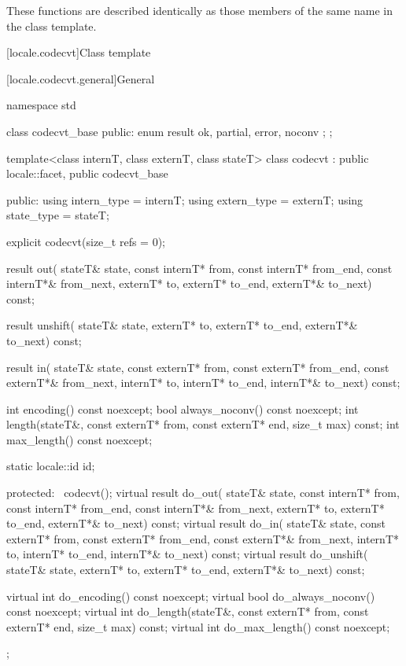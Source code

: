 \pnum
These functions are described identically as those members of the same name
in the  class template.

[locale.codecvt]{Class template }

[locale.codecvt.general]{General}

%
\begin{codeblock}
namespace std {
  class codecvt_base {
  public:
    enum result { ok, partial, error, noconv };
  };

  template<class internT, class externT, class stateT>
    class codecvt : public locale::facet, public codecvt_base {
    public:
      using intern_type = internT;
      using extern_type = externT;
      using state_type  = stateT;

      explicit codecvt(size_t refs = 0);

      result out(
        stateT& state,
        const internT* from, const internT* from_end, const internT*& from_next,
              externT*   to,       externT*   to_end,       externT*&   to_next) const;

      result unshift(
        stateT& state,
              externT*    to,      externT*   to_end,       externT*&   to_next) const;

      result in(
        stateT& state,
        const externT* from, const externT* from_end, const externT*& from_next,
              internT*   to,       internT*   to_end,       internT*&   to_next) const;

      int encoding() const noexcept;
      bool always_noconv() const noexcept;
      int length(stateT&, const externT* from, const externT* end, size_t max) const;
      int max_length() const noexcept;

      static locale::id id;

    protected:
      ~codecvt();
      virtual result do_out(
        stateT& state,
        const internT* from, const internT* from_end, const internT*& from_next,
              externT* to,         externT*   to_end,       externT*&   to_next) const;
      virtual result do_in(
        stateT& state,
        const externT* from, const externT* from_end, const externT*& from_next,
              internT* to,         internT*   to_end,       internT*&   to_next) const;
      virtual result do_unshift(
        stateT& state,
              externT* to,         externT*   to_end,       externT*&   to_next) const;

      virtual int do_encoding() const noexcept;
      virtual bool do_always_noconv() const noexcept;
      virtual int do_length(stateT&, const externT* from, const externT* end, size_t max) const;
      virtual int do_max_length() const noexcept;
    };
}
\end{codeblock}

